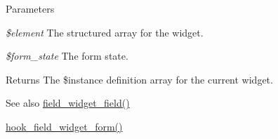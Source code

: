 \begin{DoxyParams}{Parameters}
\item[{\em \$element}]The structured array for the widget. \item[{\em \$form\_\-state}]The form state.\end{DoxyParams}
\begin{DoxyReturn}{Returns}
The \$instance definition array for the current widget.
\end{DoxyReturn}
\begin{DoxySeeAlso}{See also}
\hyperlink{field_8form_8inc_a71dcef632fc59641eee5238c7c6b335c}{field\_\-widget\_\-field()} 

\hyperlink{group__field__widget_gaa9b0e55fd0eb57ac0f9c7c30d251971b}{hook\_\-field\_\-widget\_\-form()} 
\end{DoxySeeAlso}
